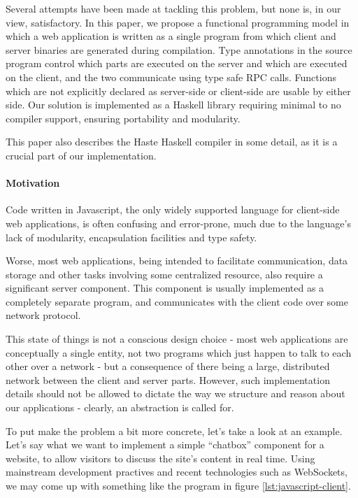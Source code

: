 \documentclass[preprint]{sigplanconf}
\begin{document}
Several attempts have been made at tackling this problem, but none is, in our
view, satisfactory. In this paper, we propose a functional programming model in
which a web application is written as a single program from which client and
server binaries are generated during compilation. Type annotations in the source
program control which parts are executed on the server and which are executed
on the client, and the two communicate using type safe RPC calls. Functions
which are not explicitly declared as server-side or client-side are usable by
either side. Our solution is implemented as a Haskell library requiring minimal
to no compiler support, ensuring portability and modularity.

This paper also describes the Haste Haskell compiler in some detail, as it is a
crucial part of our implementation.

\paragraph{Motivation}

Code written in Javascript, the only widely supported language for client-side
web applications, is often confusing and error-prone, much due to the
language's lack of modularity, encapsulation facilities and type safety.

Worse, most web applications, being intended to facilitate communication, data
storage and other tasks involving some centralized resource, also require a
significant server component. This component is usually implemented as a
completely separate program, and communicates with the client code over some
network protocol.

This state of things is not a conscious design choice - most web applications
are conceptually a single entity, not two programs which just happen to talk
to each other over a network - but a consequence of there being a large,
distributed network between the client and server parts.
However, such implementation details should not be allowed to dictate the way
we structure and reason about our applications - clearly, an abstraction is
called for.

To put make the problem a bit more concrete, let's take a look at an example.
Let's say what we want to implement a simple ``chatbox'' component for a
website, to allow visitors to discuss the site's content in real time. Using
mainstream development practives and recent technologies such as WebSockets,
we may come up with something like the program in figure
\ref{lst:javascript-client}.
\end{document}
